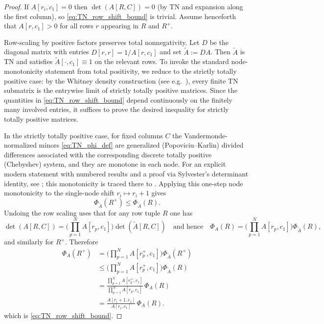 \begin{proof}
If $A[r_i,c_1]=0$ then $\det(A[R,C])=0$ (by TN and expansion along the first column), so \eqref{eq:TN_row_shift_bound} is trivial.
Assume henceforth that $A[r,c_1]>0$ for all rows $r$ appearing in $R$ and $R^+$.

Row-scaling by positive factors preserves total nonnegativity.
Let $D$ be the diagonal matrix with entries $D[r,r]=1/A[r,c_1]$ and set $\widetilde A:=DA$.
Then $\widetilde A$ is TN and satisfies $\widetilde A[\cdot,c_1]\equiv 1$ on the relevant rows.
To invoke the standard node-monotonicity statement from total positivity, we reduce to the strictly totally positive case:
by the Whitney density construction (see e.g.\ \cite[Thm.~2.6 and its proof]{Pinkus1996}),
every finite TN submatrix is the entrywise limit of strictly totally positive matrices.
Since the quantities in \eqref{eq:TN_row_shift_bound} depend continuously on the finitely many involved entries,
it suffices to prove the desired inequality for strictly totally positive matrices.

In the strictly totally positive case, for fixed columns $C$ the Vandermonde-normalized minors \eqref{eq:TN_phi_def} are generalized
(Popoviciu--Karlin) divided differences associated with the corresponding discrete totally positive (Chebyshev) system,
and they are monotone in each node.
For an explicit modern statement with numbered results and a proof via Sylvester's determinant identity, see
\cite[Cor.~3(ii)]{PalesRadacsi2018}; this monotonicity is traced there to \cite[Thm.~2]{Wasowicz2006}.
Applying this one-step node monotonicity to the single-node shift $r_i\mapsto r_i+1$ gives
\[
\Phi_{\widetilde A}(R^+)\le \Phi_{\widetilde A}(R).
\]
Undoing the row scaling uses that for any row tuple $R$ one has
\[
\det(A[R,C])=\Big(\prod_{p=1}^N A[r_p,c_1]\Big)\det(\widetilde A[R,C])
\quad\text{and hence}\quad
\Phi_A(R)=\Big(\prod_{p=1}^N A[r_p,c_1]\Big)\Phi_{\widetilde A}(R),
\]
and similarly for $R^+$. Therefore
\[
\begin{aligned}
\Phi_A(R^+)
&=\Big(\prod_{p=1}^N A[r_p^+,c_1]\Big)\Phi_{\widetilde A}(R^+)\\
&\le\Big(\prod_{p=1}^N A[r_p^+,c_1]\Big)\Phi_{\widetilde A}(R)\\
&=\frac{\prod_{p=1}^N A[r_p^+,c_1]}{\prod_{p=1}^N A[r_p,c_1]}
\,\Phi_A(R)\\
&=\frac{A[r_i+1,c_1]}{A[r_i,c_1]}\,\Phi_A(R).
\end{aligned}
\]
which is \eqref{eq:TN_row_shift_bound}.
\end{proof}

